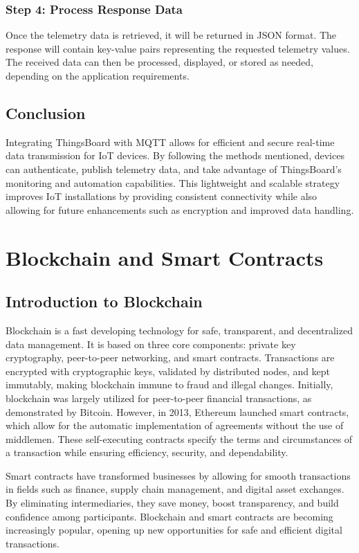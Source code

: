 \documentclass[a4paper,12pt]{report}
\begin{document}
 \subsection{Step 4: Process Response Data}
 Once the telemetry data is retrieved, it will be returned in JSON format. The response will contain key-value pairs representing the requested telemetry values. The received data can then be processed, displayed, or stored as needed, depending on the application requirements.
 \section{Conclusion}
 Integrating ThingsBoard with MQTT allows for efficient and secure real-time data transmission for IoT devices. By following the methods mentioned, devices can authenticate, publish telemetry data, and take advantage of ThingsBoard's monitoring and automation capabilities. This lightweight and scalable strategy improves IoT installations by providing consistent connectivity while also allowing for future enhancements such as encryption and improved data handling.

\chapter{Blockchain and Smart Contracts}
\section{Introduction to Blockchain}
Blockchain is a fast developing technology for safe, transparent, and decentralized data management. It is based on three core components: private key cryptography, peer-to-peer networking, and smart contracts\cite{swan2016blockchain}. Transactions are encrypted with cryptographic keys, validated by distributed nodes, and kept immutably, making blockchain immune to fraud and illegal changes\cite{tern2021survey}.
Initially, blockchain was largely utilized for peer-to-peer financial transactions, as demonstrated by Bitcoin.  However, in 2013, Ethereum launched smart contracts, which allow for the automatic implementation of agreements without the use of middlemen\cite{yuan2018shadoweth}.  These self-executing contracts specify the terms and circumstances of a transaction while ensuring efficiency, security, and dependability\cite{falazi2020smart}.

 Smart contracts have transformed businesses by allowing for smooth transactions in fields such as finance, supply chain management, and digital asset exchanges.  By eliminating intermediaries, they save money, boost transparency, and build confidence among participants\cite{johari2021smart}.  Blockchain and smart contracts are becoming increasingly popular, opening up new opportunities for safe and efficient digital transactions.
\end{document}
